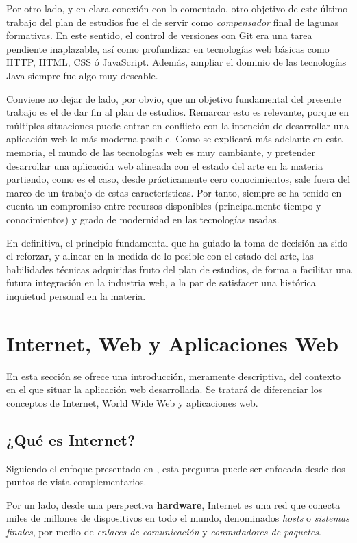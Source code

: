 \documentclass[a4paper,12pt,twoside,openright]{report}
\begin{document}
    Por otro lado, y en clara conexión con lo comentado, otro objetivo de este último trabajo del plan de estudios fue el de servir como \emph{compensador} final de lagunas formativas. En este sentido, el control de versiones con Git era una tarea pendiente inaplazable, así como profundizar en tecnologías web básicas como HTTP, HTML, CSS ó JavaScript. Además, ampliar el dominio de las tecnologías Java siempre fue algo muy deseable.
    
    Conviene no dejar de lado, por obvio, que un objetivo fundamental del presente trabajo es el de dar fin al plan de estudios. Remarcar esto es relevante, porque en múltiples situaciones puede entrar en conflicto con la intención de desarrollar una aplicación web lo más moderna posible. Como se explicará más adelante en esta memoria, el mundo de las tecnologías web es muy cambiante, y pretender desarrollar una aplicación web alineada con el estado del arte en la materia partiendo, como es el caso, desde prácticamente cero conocimientos, sale fuera del marco de un trabajo de estas características. Por tanto, siempre se ha tenido en cuenta un compromiso entre recursos disponibles (principalmente tiempo y conocimientos) y grado de modernidad en las tecnologías usadas.
    
    En definitiva, el principio fundamental que ha guiado la toma de decisión ha sido el reforzar, y alinear en la medida de lo posible con el estado del arte, las habilidades técnicas adquiridas fruto del plan de estudios, de forma a facilitar una futura integración en la industria web, a la par de satisfacer una histórica inquietud personal en la materia.

    \section{Internet, Web y Aplicaciones Web}
    En esta sección se ofrece una introducción, meramente descriptiva, del contexto en el que situar la aplicación web desarrollada. Se tratará de diferenciar los conceptos de Internet, World Wide Web y aplicaciones web.

    \subsection{¿Qué es Internet?}
    Siguiendo el enfoque presentado en \cite{Kurose2016}, esta pregunta puede ser enfocada desde dos puntos de vista complementarios.
    
    Por un lado, desde una perspectiva \textbf{hardware}, Internet es una red que conecta miles de millones de dispositivos en todo el mundo, denominados \emph{hosts} o \emph{sistemas finales}, por medio de \emph{enlaces de comunicación} y \emph{conmutadores de paquetes}.
    
\end{document}
